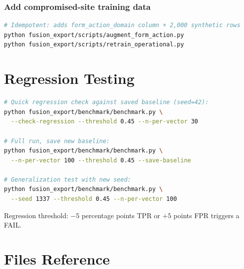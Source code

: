 \documentclass[11pt,a4paper]{article}
\begin{document}
\subsubsection*{Add compromised-site training data}

\begin{lstlisting}[language=bash]
# Idempotent: adds form_action_domain column + 2,000 synthetic rows
python fusion_export/scripts/augment_form_action.py
python fusion_export/scripts/retrain_operational.py
\end{lstlisting}

\section{Regression Testing}

\begin{lstlisting}[language=bash]
# Quick regression check against saved baseline (seed=42):
python fusion_export/benchmark/benchmark.py \
  --check-regression --threshold 0.45 --n-per-vector 30

# Full run, save new baseline:
python fusion_export/benchmark/benchmark.py \
  --n-per-vector 100 --threshold 0.45 --save-baseline

# Generalization test with new seed:
python fusion_export/benchmark/benchmark.py \
  --seed 1337 --threshold 0.45 --n-per-vector 100
\end{lstlisting}

Regression threshold: $-5$ percentage points TPR or $+5$ points FPR
triggers a FAIL.

\section{Files Reference}
\end{document}
